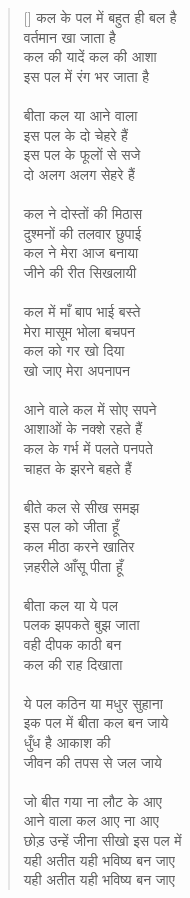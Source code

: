 \begin{verse}[\versewidth]\texthindi{
कल के पल में बहुत ही बल है\\
वर्तमान खा जाता है\\
कल की यादें कल की आशा\\
इस पल में रंग भर जाता है\\
\\
बीता कल या आने वाला\\
इस पल के दो चेहरे हैं\\
इस पल के फूलों से सजे\\
दो अलग अलग सेहरे हैं\\
\\
कल ने दोस्तों की मिठास\\
दुश्मनों की तलवार छुपाई\\
कल ने मेरा आज बनाया\\
जीने की रीत सिखलायी\\
\\
कल में माँ बाप भाई बस्ते\\
मेरा मासूम भोला बचपन\\
कल को गर खो दिया\\
खो जाए मेरा अपनापन\\
\\
आने वाले कल में सोए सपने\\
आशाओं के नक्शे रहते हैं\\
कल के गर्भ में पलते पनपते\\
चाहत के झरने बहते हैं\\
\\
बीते कल से सीख समझ\\
इस पल को जीता हूँ\\
कल मीठा करने खातिर\\
ज़हरीले आँसू पीता हूँ\\
\\
बीता कल या ये पल\\
पलक झपकते बुझ जाता\\
वही दीपक काठी बन\\
कल की राह दिखाता\\
\\
ये पल कठिन या मधुर सुहाना\\
इक पल में बीता कल बन जाये\\
धुँध है आकाश की\\
जीवन की तपस से जल जाये\\
\\
जो बीत गया ना लौट के आए\\
आने वाला कल आए ना आए\\
छोड़ उन्हें जीना सीखो इस पल में\\
यही अतीत यही भविष्य बन जाए\\
यही अतीत यही भविष्य बन जाए
}
\end{verse}

